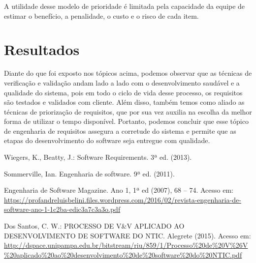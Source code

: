 \documentclass[runningheads]{llncs}
\begin{document}
A utilidade desse modelo de prioridade é limitada pela capacidade da equipe de estimar o benefício, a penalidade, o custo e o risco de cada item.

\section{Resultados}
Diante do que foi exposto nos tópicos acima, podemos observar que as técnicas de verificação e validação andam lado a lado com o desenvolvimento saudável e a qualidade do sistema, pois em todo o ciclo de vida desse processo, os requisitos são testados e validados com cliente. Além disso, também temos como aliado as técnicas de priorização de requisitos, que por sua vez auxilia na escolha da melhor forma de utilizar o tempo disponível. Portanto, podemos concluir que esse tópico de engenharia de requisitos assegura a corretude do sistema e permite que as etapas do desenvolvimento do software seja entregue com qualidade.






%
%
%
% 
%

\begin{thebibliography}{}
Wiegers, K., Beatty, J.: Software Requirements. 3ª ed. (2013).

Sommerville, Ian. Engenharia de software. 9ª ed. (2011).

Engenharia de Software Magazine. Ano 1, 1ª ed (2007), 68 -- 74. Acesso em: \url{https://profandreluisbelini.files.wordpress.com/2016/02/revista-engenharia-de-software-ano-1-1c2ba-edic3a7c3a3o.pdf}

Dos Santos, C. W.: PROCESSO DE V&V APLICADO AO DESENVOLVIMENTO DE SOFTWARE DO NTIC. Alegrete (2015). Acesso em: \url{http://dspace.unipampa.edu.br/bitstream/riu/859/1/Processo\%20de\%20V\%26V\%20aplicado\%20ao\%20desenvolvimento\%20de\%20software\%20do\%20NTIC.pdf}

\end{thebibliography}
\end{document}

